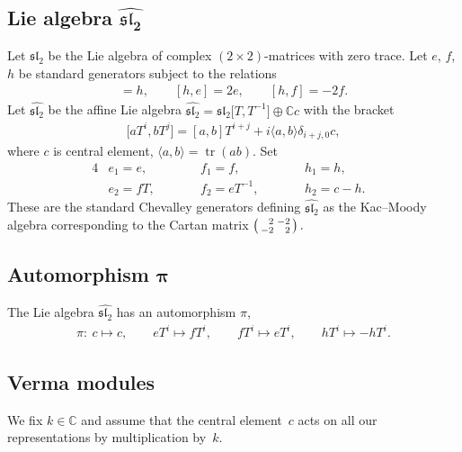 \subsection[Lie algebra $\widehat{{\mathfrak{sl}_2}}$]{Lie algebra $\boldsymbol{\widehat{{\mathfrak{sl}_2}}}$} \label{lie alg hsl}

Let $\mathfrak{sl}_2$ be the Lie algebra of complex $(2\times 2)$-matrices with zero trace. Let $e$, $f$, $h$ be standard generators subject to the relations
\begin{gather*}
[e,f]=h,\qquad [h,e]=2e,\qquad [h,f]=-2f.
\end{gather*}
Let $\widehat{{\mathfrak{sl}_2}}$ be the affine Lie algebra $\widehat{{\mathfrak{sl}_2}}=\mathfrak{sl}_2\big[T,T^{-1}\big]\oplus{\mathbb C} c$ with the bracket
\begin{gather*}
\big[aT^i,bT^j\big] = [a,b]T^{i+j} + i \langle a,b\rangle \delta_{i+j,0} c ,
\end{gather*}
where $c$ is central element, $\langle a,b\rangle=\operatorname{tr} (ab)$. Set
\begin{alignat*}{4}
&e_1 = e, \qquad && f_1 = f, \qquad && h_1=h,& \\
& e_2 = fT, \qquad && f_2=eT^{-1}, \qquad && h_2=c-h.&
\end{alignat*}
These are the standard Chevalley generators defining $\widehat{{\mathfrak{sl}_2}}$ as the Kac--Moody algebra correspon\-ding to the Cartan matrix
$\left(\begin{smallmatrix} \hphantom{-}2&-2 \\
-2&\hphantom{-}2 \end{smallmatrix}\right).$

\subsection[Automorphism $\pi$]{Automorphism $\boldsymbol{\pi}$} \label{aut}
The Lie algebra $\widehat{{\mathfrak{sl}_2}}$ has an automorphism $\pi$,
\begin{gather*}
\pi \colon \ c \mapsto c, \qquad eT^i \mapsto fT^i, \qquad fT^i\mapsto eT^i, \qquad hT^i\mapsto -hT^i.
\end{gather*}

\subsection{Verma modules} \label{Ver mod}
We fix $k\in{\mathbb C}$ and assume that the central element~$c$ acts on all our representations by multiplication by~$k$.

